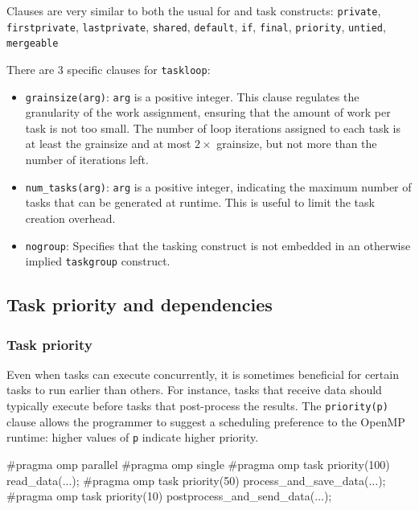 Clauses are very similar to both the usual for and task constructs:
\texttt{private}, \texttt{firstprivate}, \texttt{lastprivate}, \texttt{shared}, \texttt{default}, \texttt{if}, \texttt{final}, \texttt{priority}, \texttt{untied}, \texttt{mergeable}

There are 3 specific clauses for \texttt{taskloop}:

\begin{itemize}
    \item \texttt{grainsize(arg)}: \texttt{arg} is a positive integer. This clause regulates the granularity of the work assignment, ensuring that the amount of work per task is not too small. The number of loop iterations assigned to each task is at least the grainsize and at most $2 \times$ grainsize, but not more than the number of iterations left.
    \item \texttt{num\_tasks(arg)}: \texttt{arg} is a positive integer, indicating the maximum number of tasks that can be generated at runtime. This is useful to limit the task creation overhead.
    \item \texttt{nogroup}: Specifies that the tasking construct is not embedded in an otherwise implied \texttt{taskgroup} construct.
\end{itemize}

\subsection{Task priority and dependencies}

\subsubsection{Task priority}

Even when tasks can execute concurrently, it is sometimes beneficial for certain tasks to run earlier than others. For instance, tasks that receive data should typically execute before tasks that post-process the results. The \texttt{priority(p)} clause allows the programmer to suggest a scheduling preference to the OpenMP runtime: higher values of \texttt{p} indicate higher priority.

\begin{codeblock}[language = C, morekeywords={pragma}]
#pragma omp parallel
#pragma omp single
{
    #pragma omp task priority(100)
    read_data(...);
    #pragma omp task priority(50)
    process_and_save_data(...);
    #pragma omp task priority(10)
    postprocess_and_send_data(...);
}
\end{codeblock}

